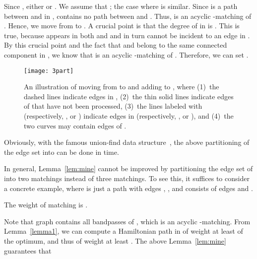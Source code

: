 \documentclass[11pt,twoside]{article}\usepackage{amssymb,latexsym,graphicx,hyperref}\usepackage{epstopdf}
\newenvironment{proof}{{\sc Proof. }}{\hfill\vspace{0.2in}}
\begin{document}
\begin{proof}
Since , either  or . 
We assume that ; the case where  is similar. 
Since  is a path between  and  in ,  contains no path between  and .
Thus,  is an acyclic -matching of .
Hence, we move  from  to . 
A crucial point is that the degree of  in  is . 
This is true, because  appears in both  and  and in turn cannot be incident to an edge in .
By this crucial point and the fact that  and  belong to the same connected component in ,
we know that  is an acyclic -matching of .
Therefore, we can set . 


\begin{figure}[ht]
\centerline{\texttt{[image: 3part]}}
\caption{An illustration of moving  from  to  and 
adding  to , where (1)~the dashed lines indicate edges in ,  
(2)~the thin solid lines indicate edges of  that have not been processed, 
(3)~the lines labeled with  (respectively, , or ) indicate edges in  
(respectively, , or ), and 
(4)~the two curves may contain edges of .} 
\label{fig:3part}
\end{figure}


Obviously, with the famous union-find data structure~\cite{Tar75},
the above partitioning of the edge set  into  can be done in  time. 
\end{proof}


In general, Lemma~\ref{lem:mine} cannot be improved by partitioning the edge set of  into two matchings instead of three matchings.
To see this, it suffices to consider a concrete example,
where  is just a path with edges , ,  and
 consists of edges  and . 


\begin{lemma}
\label{lemma42}
The weight of matching  is .
\end{lemma}
\begin{proof}
Note that graph  contains all bandpasses of , which is an acyclic -matching.
From Lemma~\ref{lemma1}, we can compute a Hamiltonian path  in  of weight at least  of the optimum,
and thus of weight at least .
The above Lemma~\ref{lem:mine} guarantees that

\end{proof}
\end{document}
